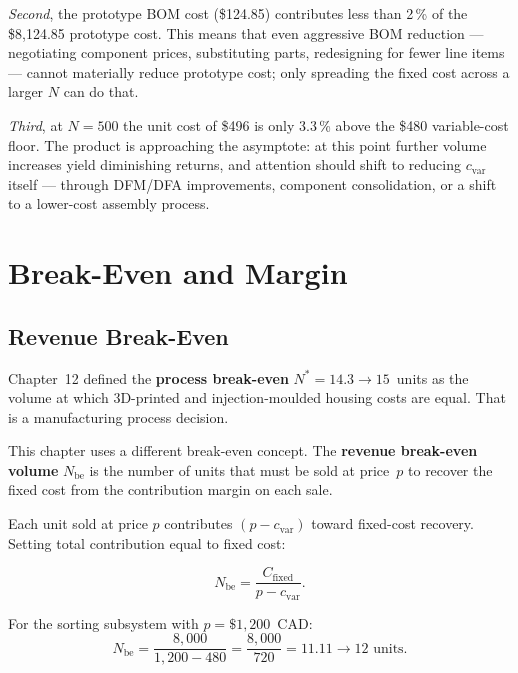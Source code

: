 \textit{Second}, the prototype BOM cost (\$124.85) contributes less than
2\,\% of the \$8,124.85 prototype cost.
This means that even aggressive BOM reduction --- negotiating component
prices, substituting parts, redesigning for fewer line items --- cannot
materially reduce prototype cost; only spreading the fixed cost across
a larger $N$ can do that.

\textit{Third}, at $N = 500$ the unit cost of \$496 is only 3.3\,\% above
the \$480 variable-cost floor.
The product is approaching the asymptote: at this point further volume
increases yield diminishing returns, and attention should shift to
reducing $c_{\text{var}}$ itself --- through DFM/DFA improvements,
component consolidation, or a shift to a lower-cost assembly process.

\section{Break-Even and Margin}
\label{sec:ch17-breakeven-margin}

\subsection{Revenue Break-Even}
\label{sec:ch17-nbe}

Chapter~12 defined the \textbf{process break-even}
$N^{*} = 14.3 \to 15$~units as the volume at which 3D-printed and
injection-moulded housing costs are equal.
That is a manufacturing process decision.

This chapter uses a different break-even concept.
The \textbf{revenue break-even volume}
$N_{\text{be}}$ is the number of units that must be sold at price~$p$
to recover the fixed cost from the contribution margin on each sale.

Each unit sold at price $p$ contributes $(p - c_{\text{var}})$ toward
fixed-cost recovery.
Setting total contribution equal to fixed cost:

\begin{equation}
  N_{\text{be}} = \frac{C_{\text{fixed}}}{p - c_{\text{var}}}.
  \label{eq:ch17-nbe}
\end{equation}

For the sorting subsystem with $p = \$1{,}200$~CAD:
\[
  N_{\text{be}} = \frac{8{,}000}{1{,}200 - 480}
                = \frac{8{,}000}{720}
                = 11.11 \to 12\text{ units.}
\]

